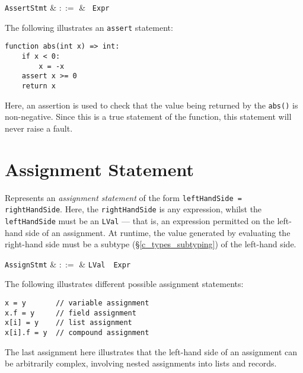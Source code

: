 \begin{syntax}
  \verb+AssertStmt+ & $::=$ & \ \verb+Expr+\\
\end{syntax}

\noindent The following illustrates an \lstinline{assert} statement:
\begin{lstlisting}
function abs(int x) => int:
    if x < 0:
        x = -x
    assert x >= 0
    return x
\end{lstlisting}

Here, an assertion is used to check that the value being returned by the \lstinline{abs()} is non-negative.  Since this is a true statement of the function, this statement will never raise a fault.


\section{Assignment Statement}

Represents an {\em assignment statement} of the form \lstinline{leftHandSide = rightHandSide}.  Here, the \lstinline{rightHandSide} is any expression, whilst the \lstinline{leftHandSide} must be an \lstinline{LVal} --- that is, an expression permitted on the left-hand side of an assignment.  At runtime, the value generated by evaluating the right-hand side must be a subtype (\S\ref{c_types_subtyping}) of the left-hand side.

\begin{syntax}
  \verb+AssignStmt+ & $::=$ & \verb+LVal+\ \token{=}\ \verb+Expr+\\
\end{syntax}


\noindent The following illustrates different possible assignment statements:
\begin{lstlisting}
x = y       // variable assignment
x.f = y     // field assignment
x[i] = y    // list assignment
x[i].f = y  // compound assignment
\end{lstlisting}

The last assignment here illustrates that the left-hand side of an assignment can be arbitrarily complex, involving nested assignments into lists and records.


